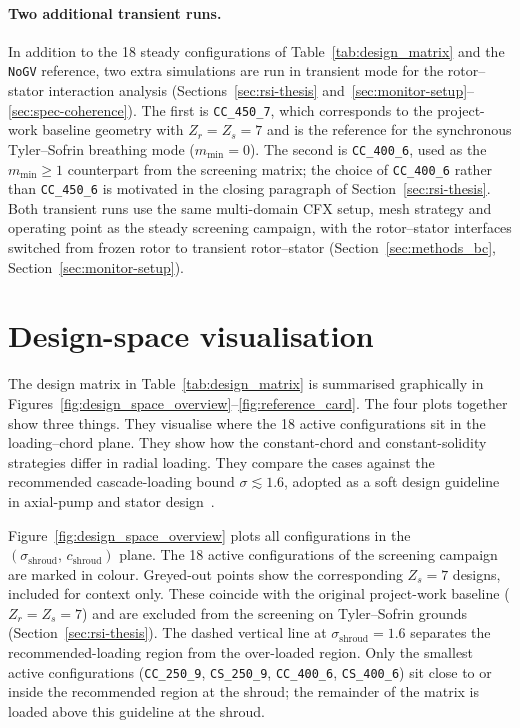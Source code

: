 \paragraph{Two additional transient runs.}
In addition to the 18 steady configurations of Table~\ref{tab:design_matrix} and the \texttt{NoGV} reference, two extra simulations are run in transient mode for the rotor--stator interaction analysis (Sections~\ref{sec:rsi-thesis} and~\ref{sec:monitor-setup}--\ref{sec:spec-coherence}). The first is \texttt{CC\_450\_7}, which corresponds to the project-work baseline geometry with $Z_r=Z_s=7$ and is the reference for the synchronous Tyler--Sofrin breathing mode ($m_{\min}=0$). The second is \texttt{CC\_400\_6}, used as the $m_{\min}\geq 1$ counterpart from the screening matrix; the choice of \texttt{CC\_400\_6} rather than \texttt{CC\_450\_6} is motivated in the closing paragraph of Section~\ref{sec:rsi-thesis}. Both transient runs use the same multi-domain CFX setup, mesh strategy and operating point as the steady screening campaign, with the rotor--stator interfaces switched from frozen rotor to transient rotor--stator (Section~\ref{sec:methods_bc}, Section~\ref{sec:monitor-setup}).

\section{Design-space visualisation}
\label{sec:methods_design_space_viz}

The design matrix in Table~\ref{tab:design_matrix} is summarised graphically in Figures~\ref{fig:design_space_overview}--\ref{fig:reference_card}. The four plots together show three things. They visualise where the 18 active configurations sit in the loading--chord plane. They show how the constant-chord and constant-solidity strategies differ in radial loading. They compare the cases against the recommended cascade-loading bound $\sigma \lesssim 1.6$, adopted as a soft design guideline in axial-pump and stator design~\cite{Gulich2010}.

Figure~\ref{fig:design_space_overview} plots all configurations in the $(\sigma_{\mathrm{shroud}},\,c_{\mathrm{shroud}})$ plane. The 18 active configurations of the screening campaign are marked in colour. Greyed-out points show the corresponding $Z_s = 7$ designs, included for context only. These coincide with the original project-work baseline ($Z_r = Z_s = 7$) and are excluded from the screening on Tyler--Sofrin grounds (Section~\ref{sec:rsi-thesis}). The dashed vertical line at $\sigma_{\mathrm{shroud}} = 1.6$ separates the recommended-loading region from the over-loaded region. Only the smallest active configurations (\texttt{CC\_250\_9}, \texttt{CS\_250\_9}, \texttt{CC\_400\_6}, \texttt{CS\_400\_6}) sit close to or inside the recommended region at the shroud; the remainder of the matrix is loaded above this guideline at the shroud.

